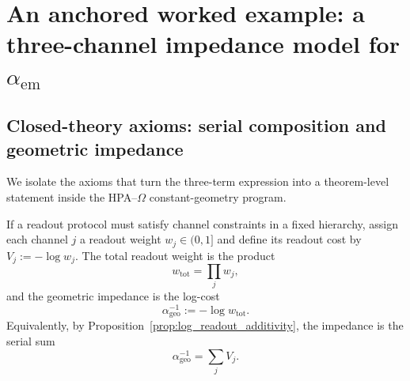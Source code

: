 \section{An anchored worked example: a three-channel impedance model for \texorpdfstring{$\alpha_{\mathrm{em}}$}{alpha\_em}}
\label{sec:alpha_anchor}

\subsection{Closed-theory axioms: serial composition and geometric impedance}
We isolate the axioms that turn the three-term expression into a theorem-level statement inside the HPA--$\Omega$ constant-geometry program.

\begin{axiom}
\label{ax:serial_impedance}
If a readout protocol must satisfy channel constraints in a fixed hierarchy, assign each channel $j$ a readout weight $w_j\in(0,1]$ and define its readout cost by $V_j:=-\log w_j$. The total readout weight is the product
\begin{equation}
w_{\mathrm{tot}}=\prod_j w_j,
\end{equation}
and the geometric impedance is the log-cost
\begin{equation}
\alpha_{\mathrm{geo}}^{-1}:=-\log w_{\mathrm{tot}}.
\end{equation}
Equivalently, by Proposition~\ref{prop:log_readout_additivity}, the impedance is the serial sum
\begin{equation}
\alpha_{\mathrm{geo}}^{-1}=\sum_{j} V_j.
\end{equation}
\end{axiom}

